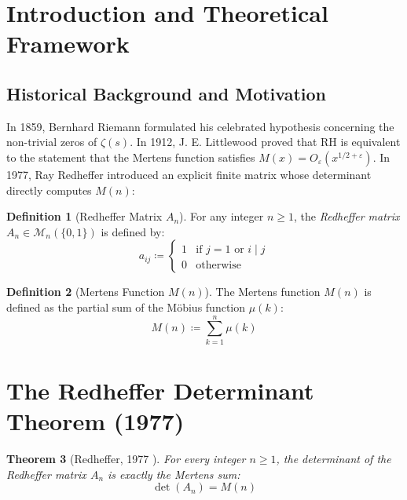 \documentclass[11pt,a4paper]{article}
\newtheorem{theorem}{Theorem}[section]
\theoremstyle{definition}
\newtheorem{definition}[theorem]{Definition}
\begin{document}
\tableofcontents
\newpage

\section{Introduction and Theoretical Framework}

\subsection{Historical Background and Motivation}
In 1859, Bernhard Riemann \cite{riemann1859} formulated his celebrated hypothesis concerning the non-trivial zeros of $\zeta(s)$.
In 1912, J. E. Littlewood proved that RH is equivalent to the statement that the Mertens function satisfies $M(x) = O_\varepsilon(x^{1/2 + \varepsilon})$.
In 1977, Ray Redheffer \cite{redheffer1977} introduced an explicit finite matrix whose determinant directly computes $M(n)$:

\begin{definition}[Redheffer Matrix $A_n$]\label{def:redheffer_matrix}
For any integer $n \ge 1$, the \emph{Redheffer matrix} $A_n \in \mathcal{M}_n(\{0, 1\})$ is defined by:
\begin{equation}\label{eq:redheffer_def}
a_{ij} \coloneqq \begin{cases} 1 & \text{if } j = 1 \text{ or } i \mid j \\ 0 & \text{otherwise} \end{cases}
\end{equation}
\end{definition}

\begin{definition}[Mertens Function $M(n)$]\label{def:mertens_def}
The Mertens function $M(n)$ is defined as the partial sum of the M\"obius function $\mu(k)$:
\begin{equation}\label{eq:mertens_sum}
M(n) \coloneqq \sum_{k=1}^n \mu(k)
\end{equation}
\end{definition}

\section{The Redheffer Determinant Theorem (1977)}

\begin{theorem}[Redheffer, 1977 \cite{redheffer1977}]\label{thm:redheffer_det}
For every integer $n \ge 1$, the determinant of the Redheffer matrix $A_n$ is exactly the Mertens sum:
\begin{equation}\label{eq:redheffer_identity}
\det(A_n) = M(n)
\end{equation}
\end{theorem}
\end{document}
